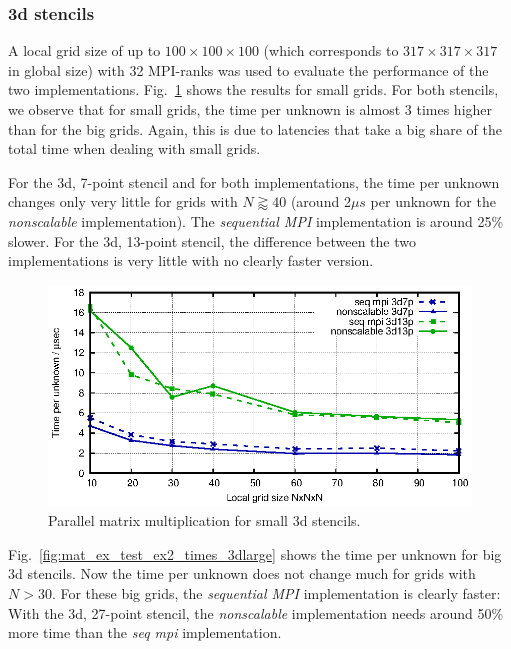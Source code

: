 \subsubsection*{3d stencils}
A local grid size of up to $100 \times 100 \times 100$ (which corresponds to $317 \times 317 \times 317$ in global size) with 32 MPI-ranks was used to evaluate the performance of the two implementations.  Fig.~\ref{fig:mat_ex_test_ex2_times_3dsmall} shows the results for small grids. For both stencils, we observe that for small grids, the time per unknown is almost 3 times higher than for the big grids. Again, this is due to latencies that take a big share of the total time when dealing with small grids.

For the 3d, 7-point stencil and for both implementations, the time per unknown changes only very little for grids with $N \gtrapprox 40$ (around 2$\mu  s$ per unknown for the \textit{nonscalable} implementation). The \textit{sequential MPI} implementation is around 25\% slower. For the 3d, 13-point stencil, the difference between the two implementations is very little with no clearly faster version. 


\begin{figure}[tbp]
	\centering
	\vspace*{-2.5mm}\includegraphics[width=1\textwidth]{times_3dsmall}
	\caption{Parallel matrix multiplication for small 3d stencils. } 
	\label{fig:mat_ex_test_ex2_times_3dsmall}
\end{figure}

Fig.~\ref{fig:mat_ex_test_ex2_times_3dlarge} shows the time per unknown for big 3d stencils. Now the time per unknown does not change much for grids with $N > 30$. For these big grids, the \textit{sequential MPI} implementation is clearly faster: With the 3d, 27-point stencil, the \textit{nonscalable} implementation needs around 50\% more time than the \textit{seq mpi} implementation. 

